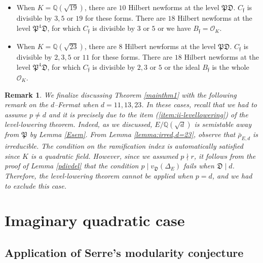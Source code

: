 \documentclass[]{article}
\newtheorem{remark}{Remark}
\newcommand {\QQ}{{\mathbb{Q}}}
\newcommand {\mcalO}{{\mathcal{O}}}
\newcommand {\mfp}{{\mathfrak{P}}}
\newcounter{cases}
\begin{document}
\begin{itemize}
    \item When $K=\QQ(\sqrt{19})$, there are $10$ Hilbert newforms at the level $\mfp\mathfrak{D}$. $C_\mathfrak{f}$ is divisible by $3,5$ or $19$ for these forms. There are $18$ Hilbert newforms at the level $\mfp^4\mathfrak{D}$, for which $C_\mathfrak{f}$ is divisible by $3$ or $5$ or we have $B_\mathfrak{f}=\mcalO_K$. 

    \item When $K=\QQ(\sqrt{23})$, there are $8$ Hilbert newforms at the level $\mfp\mathfrak{D}$. $C_\mathfrak{f}$ is divisible by $2,3,5$ or $11$ for these forms. There are $18$ Hilbert newforms at the level $\mfp^4\mathfrak{D}$, for which $C_\mathfrak{f}$ is divisible by $2,3$ or $5$ or the ideal $B_\mathfrak{f}$ is the whole $\mcalO_K$. 
\end{itemize}

\begin{remark}
    We finalize discussing Theorem \ref{mainthm1} with the following remark on the $d$--Fermat when $d=11,13,23$. In these cases, recall that we had to assume $p\ne d$ and it is precisely due to the item (\ref{item:ii-levellowering}) of the level-lowering theorem. Indeed, as we discussed, $E/\QQ(\sqrt{d})$ is semistable away from $\mfp$ by Lemma \ref{Esem}. From Lemma \ref{lemma:irred,d=23}, observe that $\bar{\rho}_{E, d}$ is irreducible. The condition on the ramification index is automatically satisfied since $K$ is a quadratic field. However, since we assumed $p\nmid r$, it follows from the proof of Lemma \ref{pdivdel} that the condition $p\mid v_{\mathfrak{D}}(\Delta_E)$ fails when $\mathfrak{D}\mid d$. Therefore, the level-lowering theorem cannot be applied when $p=d$, and we had to exclude this case.
\end{remark}

\section{Imaginary quadratic case}\label{section:imaginaryquadratic}

\subsection{Application of Serre's modularity conjecture}
\end{document}
